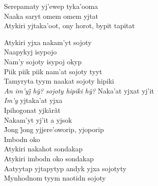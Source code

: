 \bigskip

\begin{linenumbers}\begingroup\raggedright
 
\noindent   Serepamaty yj'ewep tyka'ooma\\
  Naaka saryt omem omem yjtat\\
  Atykiri yjtaka'oot, ony horot, bypit tapitat
 
\end{linenumbers}\endgroup

\bigskip

\begin{linenumbers}\begingroup\raggedright
 
\noindent   Atykiri yjxa nakam'yt sojoty\\
  Naapykyj isypojo\\
  Nam'y sojoty isypoj okyp\\
  Piik piik piik nam'at sojoty tyyt\\
  Tamyryta tyym naakat sojoty hipiki\\
  \emph{An im’yj̃ hỹ? sojoty hipiki hỹ?} Naka’at yjxat yj’it\\
  \emph{Im'y} yjtaka'at yjxa\\
  Ipihogonat yjkãrãt\\
  Nakam'yt yj'it a yjsok\\
  J̃ong j̃ong yjjere’oworip, yjoporip\\
  Imbodn oko\\
  Atykiri nakahot sondakap\\
  Atykiri imbodn oko sondakap\\
  Aatyytap yjtapytyp andyk yjxa sojotyty\\
  Mynhodnom tyym naotidn sojoty
 
\end{linenumbers}\endgroup

